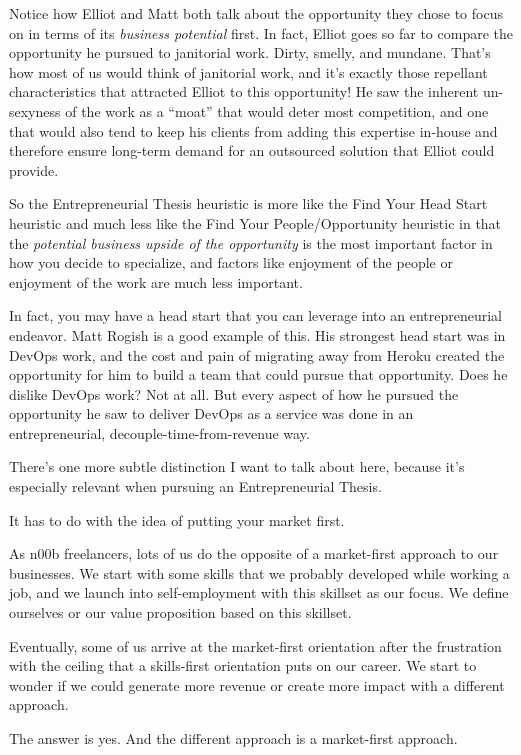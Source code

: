 Notice how Elliot and Matt both talk about the opportunity they chose to focus on in terms of its \emph{business potential} first. In fact, Elliot goes so far to compare the opportunity he pursued to janitorial work. Dirty, smelly, and mundane. That's how most of us would think of janitorial work, and it's exactly those repellant characteristics that attracted Elliot to this opportunity! He saw the inherent un-sexyness of the work as a ``moat'' that would deter most competition, and one that would also tend to keep his clients from adding this expertise in-house and therefore ensure long-term demand for an outsourced solution that Elliot could provide.

So the Entrepreneurial Thesis heuristic is more like the Find Your Head Start heuristic and much less like the Find Your People/Opportunity heuristic in that the \emph{potential business upside of the opportunity} is the most important factor in how you decide to specialize, and factors like enjoyment of the people or enjoyment of the work are much less important.

In fact, you may have a head start that you can leverage into an entrepreneurial endeavor. Matt Rogish is a good example of this. His strongest head start was in DevOps work, and the cost and pain of migrating away from Heroku created the opportunity for him to build a team that could pursue that opportunity. Does he dislike DevOps work? Not at all. But every aspect of how he pursued the opportunity he saw to deliver DevOps as a service was done in an entrepreneurial, decouple-time-from-revenue way.

There's one more subtle distinction I want to talk about here, because it's especially relevant when pursuing an Entrepreneurial Thesis.

It has to do with the idea of putting your market first.

As n00b freelancers, lots of us do the opposite of a market-first approach to our businesses. We start with some skills that we probably developed while working a job, and we launch into self-employment with this skillset as our focus. We define ourselves or our value proposition based on this skillset.

Eventually, some of us arrive at the market-first orientation after the frustration with the ceiling that a skills-first orientation puts on our career. We start to wonder if we could generate more revenue or create more impact with a different approach.

The answer is yes. And the different approach is a market-first approach.

